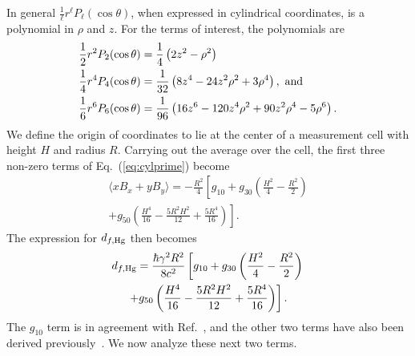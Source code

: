 \documentclass[preprint,12pt]{elsarticle}
\begin{document}

In general $\frac{1}{\ell}r^\ell P_\ell(\cos\theta)$, when expressed
in cylindrical coordinates, is a polynomial in $\rho$ and $z$.  For
the terms of interest, the polynomials are
\begin{align}
\frac{1}{2}r^2P_2(\cos\theta)&=\frac{1}{4}\left(2z^2-\rho^2\right)\\
\frac{1}{4}r^4P_4(\cos\theta)&=\frac{1}{32}\left(8z^{4}-24z^{2}\rho^{2}+3\rho^{4}\right),~{\rm and}\\
\frac{1}{6}r^6P_6(\cos\theta)&=\frac{1}{96}\left(16z^{6}-120z^{4}\rho^{2}+90z^{2}\rho^{4}-5\rho^{6}\right).
\end{align}
We define the origin of coordinates to lie at the center of a
measurement cell with height $H$ and radius $R$.  Carrying out the
average over the cell, the first three non-zero terms of
Eq.~(\ref{eq:cylprime}) become
\begin{multline}
\label{eq:xbc}
  \langle xB_x+yB_y\rangle
=-\frac{R^{2}}{4}\left[g_{10}
+g_{30}\left(\frac{H^{2}}{4}-\frac{R^2}{2}\right)\right.\\
  \left.+g_{50}\left(\frac{H^{4}}{16}-\frac{5R^2H^2}{12}+\frac{5R^4}{16}\right)\right].
\end{multline}
The expression for $d_{f,\rm Hg}$ then becomes
\begin{multline}
d_{f,\rm Hg}=\frac{\hbar\gamma^{2}R^2}{8c^{2}}\left[g_{10}
+g_{30}\left(\frac{H^{2}}{4}-\frac{R^2}{2}\right)\right.\\
  \left.+g_{50}\left(\frac{H^{4}}{16}-\frac{5R^2H^2}{12}+\frac{5R^4}{16}\right)\right].
\end{multline}
The $g_{10}$ term is in agreement with Ref.~\cite{bib:pignol-roccia},
and the other two terms have also been derived
previously~\cite{bib:pignol-priv}.  We now analyze these next two
terms.

\end{document}
